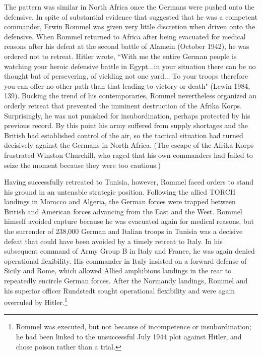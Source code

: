 \documentclass[11pt,]{article}
\begin{document}
The pattern was similar in North Africa once the Germans were pushed onto the defensive.  In spite of substantial evidence that suggested that he was a competent commander, Erwin Rommel was given very little discretion when driven onto the defensive.  When Rommel returned to Africa after being evacuated for medical reasons after his defeat at the second battle of Alamein (October 1942), he was ordered not to retreat.  Hitler wrote, ``With me the entire German people is watching your heroic defensive battle in Egypt...in your situation there can be no thought but of persevering, of yielding not one yard... To your troops therefore you can offer no other path than that leading to victory or death" (Lewin 1984, 139).  Bucking the trend of his contemporaries, Rommel nevertheless organized an orderly retreat that prevented the imminent destruction of the Afrika Korps.  Surprisingly, he was not punished for insubordination, perhaps protected by his previous record.  By this point his army suffered from supply shortages and the British had established control of the air, so the tactical situation had turned decisively against the Germans in North Africa.  (The escape of the Afrika Korps frustrated Winston Churchill, who raged that his own commanders had failed to seize the moment because they were too cautious.)

Having successfully retreated to Tunisia, however, Rommel faced orders to stand his ground in an untenable strategic position.  Following the allied TORCH landings in Morocco and Algeria, the German forces were trapped between British and American forces advancing from the East and the West.  Rommel himself avoided capture because he was evacuated again for medical reasons, but the surrender of 238,000 German and Italian troops in Tunisia was a decisive defeat that could have been avoided by a timely retreat to Italy.  In his subsequent command of Army Group B in Italy and France, he was again denied operational flexibility.  His commander in Italy insisted on a forward defense of Sicily and Rome, which allowed Allied amphibious landings in the rear to repeatedly encircle German forces.  After the Normandy landings, Rommel and his superior officer Rundstedt sought operational flexibility and were again overruled by Hitler.\footnote{Rommel was executed, but not because of incompetence or insubordination; he had been linked to the unsuccessful July 1944 plot against Hitler, and chose poison rather than a trial.}
   
\end{document}
